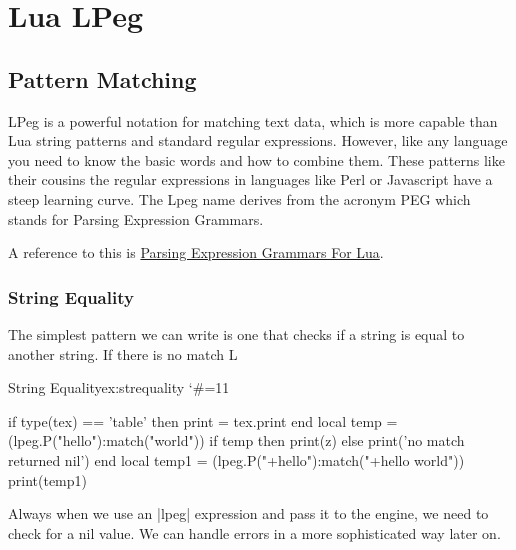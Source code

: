 \makeatletter
\long{}

   
\newenvironment{docLpeg}[1]{
  \auxm#1;
  }  
{%
\@@par
\smallskip\parindent=1em }
\makeatother

\chapter{Lua LPeg}

\section{Pattern Matching}

LPeg is a powerful notation for matching text data, which is more capable than Lua string patterns and standard regular expressions. However, like any language you need to know the basic words and how to combine them. These patterns like their  cousins the regular expressions in languages like Perl or Javascript have a steep learning curve. The Lpeg name derives from the acronym PEG which stands for Parsing Expression Grammars. 

A reference to this is \href{http://www.inf.puc-rio.br/~roberto/lpeg/}{Parsing Expression Grammars For Lua}. 

\subsection{String Equality}

The simplest pattern we can write is one that checks if a string is equal to another string. If there is no match L

\begin{texexample}{String Equality}{ex:strequality}
\bgroup
\catcode`\#=11
\begin{luacode}
if type(tex) == 'table' then print = tex.print end
local temp = (lpeg.P("hello"):match("world")) 
if temp then
   print(z)
   else print('no match returned nil') 
end   
local temp1 = (lpeg.P("+hello"):match("+hello world")) 
print(temp1)
\end{luacode}
\egroup
\end{texexample}


Always when we use an |lpeg| expression and pass it to the \tex engine, we need to check for a nil value. We can handle errors
in a more sophisticated way later on.



